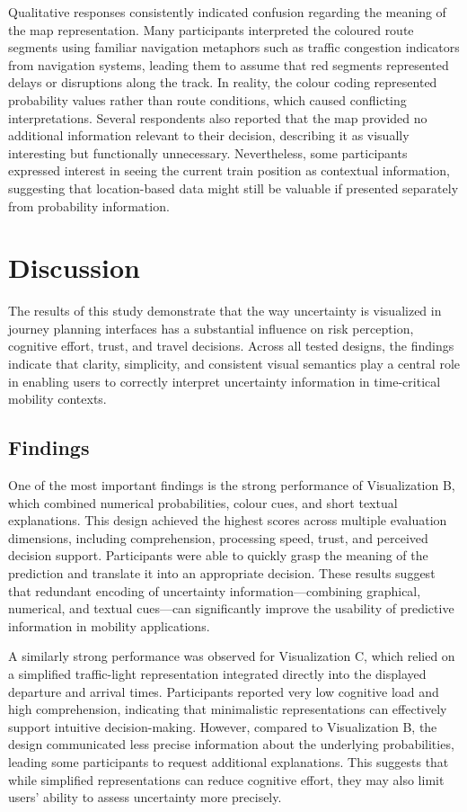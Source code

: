 \documentclass[final,journal,a4paper]{IEEEtran}
\begin{document}
Qualitative responses consistently indicated confusion regarding the meaning of the map representation. Many participants interpreted the coloured route segments using familiar navigation metaphors such as traffic congestion indicators from navigation systems, leading them to assume that red segments represented delays or disruptions along the track. In reality, the colour coding represented probability values rather than route conditions, which caused conflicting interpretations. Several respondents also reported that the map provided no additional information relevant to their decision, describing it as visually interesting but functionally unnecessary. Nevertheless, some participants expressed interest in seeing the current train position as contextual information, suggesting that location-based data might still be valuable if presented separately from probability information.

\section{Discussion} \label{Discussion}
The results of this study demonstrate that the way uncertainty is visualized in journey planning interfaces has a substantial influence on risk perception, cognitive effort, trust, and travel decisions. Across all tested designs, the findings indicate that clarity, simplicity, and consistent visual semantics play a central role in enabling users to correctly interpret uncertainty information in time-critical mobility contexts.

\subsection{Findings}
One of the most important findings is the strong performance of Visualization B, which combined numerical probabilities, colour cues, and short textual explanations. This design achieved the highest scores across multiple evaluation dimensions, including comprehension, processing speed, trust, and perceived decision support. Participants were able to quickly grasp the meaning of the prediction and translate it into an appropriate decision. These results suggest that redundant encoding of uncertainty information—combining graphical, numerical, and textual cues—can significantly improve the usability of predictive information in mobility applications.

A similarly strong performance was observed for Visualization C, which relied on a simplified traffic-light representation integrated directly into the displayed departure and arrival times. Participants reported very low cognitive load and high comprehension, indicating that minimalistic representations can effectively support intuitive decision-making. However, compared to Visualization B, the design communicated less precise information about the underlying probabilities, leading some participants to request additional explanations. This suggests that while simplified representations can reduce cognitive effort, they may also limit users’ ability to assess uncertainty more precisely.
\end{document}
